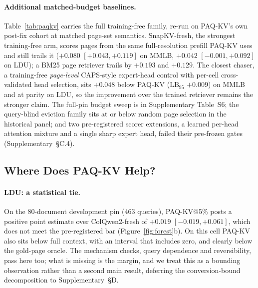 \documentclass[letterpaper]{article} %
\newcommand{\paqc}{\textsc{PAQ-KV}}
\newcommand{\lb}{\mathrm{LB}_{95}}
\begin{document}
\paragraph{Additional matched-budget baselines.} Table~\ref{tab:paqkv}
carries the full training-free family, re-run on \paqc{}'s own post-fix
cohort at matched page-set semantics. SnapKV-fresh, the strongest
training-free arm, scores pages from the same full-resolution prefill
\paqc{} uses and still trails it ($+0.080$ $[+0.043,+0.119]$ on MMLB,
$+0.042$ $[-0.001,+0.092]$ on LDU); a BM25 page retriever
\citep{robertson2009bm25} trails by $+0.193$ and $+0.129$. The closest
chaser, a training-free \emph{page-level} CAPS-style expert-head control
with per-cell cross-validated head selection, sits $+0.048$ below \paqc{}
($\lb$ $+0.009$) on MMLB and at parity on LDU, so the improvement over the
trained retriever remains the stronger claim. The full-pin budget sweep is
in Supplementary Table~S6; the query-blind eviction family sits at or below
random page selection in the historical panel; and two pre-registered
scorer extensions, a learned per-head attention mixture and a single sharp
expert head, failed their pre-frozen gates (Supplementary~\S C.4).

\subsection{Where Does \paqc{} Help?}\label{sec:results-scope}

\paragraph{LDU: a statistical tie.}\label{sec:results-longdocurl}
On the 80-document development pin (463 queries), \paqc{}@5\% posts a
positive point estimate over ColQwen2-fresh of $+0.019$
$[-0.019,+0.061]$, which does not meet the pre-registered bar
(Figure~\ref{fig:forest}b). On this cell \paqc{} also sits below full
context, with an interval that includes zero, and clearly below the
gold-page oracle. The mechanism checks, query dependence and reversibility,
pass here too; what is missing is the margin, and we treat this as a
bounding observation rather than a second main result, deferring the
conversion-bound decomposition to Supplementary~\S D.

\end{document}

